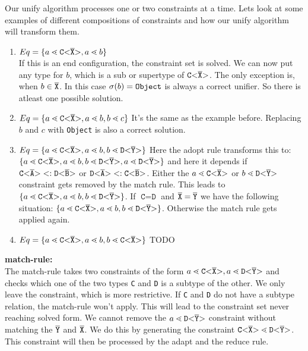 Our unify algorithm processes one or two constraints at a time.
Lets look at some examples of different compositions of constraints
and how our unify algorithm will transform them.

\begin{enumerate}
\item $Eq = \{ a \lessdot \mathtt{C {\tt <} \overline{\tt X} {\tt >} }, a \lessdot b \}$ \\
If this is an end configuration, the constraint set is solved.
We can now put any type for $b$, which is a sub or supertype of $\mathtt{C {\tt <} \overline{\tt X} {\tt >} }$.
The only exception is, when $b \in \overline{\tt X}$.
In this case $\sigma(b) = \tt{Object}$ is always a correct unifier.
So there is atleast one possible solution.

\item $Eq = \{ a \lessdot \mathtt{C {\tt <} \overline{\tt X} {\tt >} }, a \lessdot b, b \lessdot c \}$
It's the same as the example before.
Replacing $b$ and $c$ with \texttt{Object} is also a correct solution. 

\item $Eq = \{ a \lessdot \mathtt{C {\tt <} \overline{\tt X} {\tt >} }, a \lessdot b, b \lessdot \mathtt{D {\tt <} \overline{\tt Y} {\tt >} } \}$
Here the adopt rule transforms this to:
$\{ a \lessdot \mathtt{C {\tt <} \overline{\tt X} {\tt >} }, a \lessdot b, b \lessdot \mathtt{D {\tt <} \overline{\tt Y} {\tt >} }, a \lessdot \mathtt{D {\tt <} \overline{\tt Y} {\tt >} } \}$
and here it depends if $\mathtt{C {\tt <} \overline{\tt A} {\tt >} } <: \mathtt{D {\tt <} \overline{\tt B} {\tt >} }$ or $\mathtt{D {\tt <} \overline{\tt A} {\tt >} } <: \mathtt{C {\tt <} \overline{\tt B} {\tt >} }$.
Either the $a \lessdot \mathtt{C {\tt <} \overline{\tt X} {\tt >} }$ or $b \lessdot \mathtt{D {\tt <} \overline{\tt Y} {\tt >} }$ constraint
gets removed by the match rule.
This leads to $\{ a \lessdot \mathtt{C {\tt <} \overline{\tt X} {\tt >} }, a \lessdot b, b \lessdot \mathtt{D {\tt <} \overline{\tt Y} {\tt >} } \}$.
If $\texttt{C} = \texttt{D}$ and $\overline{\tt X} = \overline{\tt Y}$ we have the following situation:
$\{ a \lessdot \mathtt{C {\tt <} \overline{\tt X} {\tt >} }, a \lessdot b, b \lessdot \mathtt{D {\tt <} \overline{\tt Y} {\tt >} } \}$.
Otherwise the match rule gets applied again.

\item $Eq = \{ a \lessdot \mathtt{C {\tt <} \overline{\tt X} {\tt >} }, a \lessdot b, b \lessdot \mathtt{C {\tt <} \overline{\tt X} {\tt >} } \}$
TODO

\end{enumerate}

\textbf{match-rule:}\\
The match-rule takes two constraints of the form $a \lessdot \mathtt{C {\tt <} \overline{\tt X} {\tt >} }, a \lessdot \mathtt{D {\tt <} \overline{\tt Y} {\tt >} }$
and checks which one of the two types \texttt{C} and \texttt{D} is a subtype of the other.
We only leave the constraint, which is more restrictive.
If \texttt{C} and \texttt{D} do not have a subtype relation, the match-rule won't apply.
This will lead to the constraint set never reaching solved form.
We cannot remove the $a \lessdot \mathtt{D {\tt <} \overline{\tt Y} {\tt >} }$ constraint without matching the
$\overline{\tt Y}$ and $\overline{\tt X}$.
We do this by generating the constraint $\mathtt{C {\tt <} \overline{\tt X} {\tt >} } \lessdot \mathtt{D {\tt <} \overline{\tt Y} {\tt >} }$.
This constraint will then be processed by the adapt and the reduce rule.

